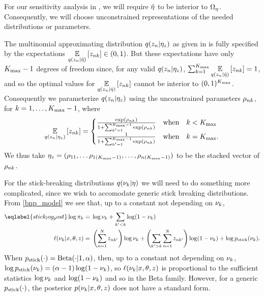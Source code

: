 
For our sensitivity analysis in , we will require
$\hat\eta$ to be interior to $\Omega_{\eta}$.  Consequently, we will choose
unconstrained representations of the needed distributions or parameters.


\begin{ex}
%
The multinomial approximating distribution $q(z_n \vert \eta_{z})$ as given in
 is fully specified by the expectations $\underset{q(z_n \vert
\hat\eta)}{\mathbb{E}}\left[z_{nk}\right] \in (0, 1)$.  But these expectations have only ${K_{\mathrm{max}}} -1$
degrees of freedom since, for any valid $q(z_n \vert \eta_{z})$,
$\sum_{k=1}^{K_{\mathrm{max}}} \underset{q(z_n \vert \hat\eta)}{\mathbb{E}}\left[z_{nk}\right] = 1$, and so the
optimal values for $\underset{q(z_n \vert \hat\eta)}{\mathbb{E}}\left[z_{nk}\right]$ cannot be
interior to $(0,1)^{K_{\mathrm{max}}}$.  Consequently we parameterize
$q(z_n \vert \eta_{z})$ using the unconstrained parameters $\rho_{nk}$,
for $k=1,\ldots,{K_{\mathrm{max}}} - 1$, where
%
\begin{align*}
%
\expect{\q(\z_\n \vert \etaz)}{\z_{\n\k}} =
\begin{cases}
    \frac{\exp(\rho_{\n\k})}{1 + \sum_{\k'=1}^{\kmax - 1}\exp(\rho_{\n\k})}
    & \mathrm{ when }\quad\k < \kmax \\
    \frac{1}{1 + \sum_{\k'=1}^{\kmax - 1}\exp(\rho_{\n\k})}
    & \mathrm{ when }\quad\k = \kmax.
\end{cases}
%
\end{align*}
%
We thus take $\eta_{z} = (\rho_{11}, \ldots \rho_{1({K_{\mathrm{max}}} - 1)}, \ldots,
\rho_{n({K_{\mathrm{max}}} - 1)})$ to be the stacked vector of $\rho_{nk}$.
%
\end{ex}



For the stick-breaking distributions $q(\nu_k \vert \eta)$ we will need to do
something more complicated, since we wish to accomodate generic stick breaking
distributions.  From \eqref{bnp_model} we see that, up to a constant not
depending on $\nu_k$,
%
\begin{align}\eqlabel{stick_log_post}
%
\log \pi_\k ={}&
    \log \nu_\k + \sum_{\k' < \k} \log (1 - \nu_\k) \nonumber \\
\logp(\nu_{\k} \vert \x, \theta, \z) ={}&
    \left(\sum_{\n=1}^\N \z_{\n\k'}\right) \log \nu_\k +
    \left( \sum_{\k' > \k} \sum_{\n=1}^\N \z_{\n\k'} \right) \log (1 - \nu_\k) +
    \log \pstick(\nu_\k).
%
\end{align}
%
When $p_{\mathrm{stick}}(\cdot) = \mathrm{Beta}(\cdot | 1, \alpha)$, then, up to a constant
not depending on $\nu_k$, $\log p_{\mathrm{stick}}(\nu_k) = (\alpha - 1) \log (1 -
\nu_k)$, so $\ell(\nu_{k} \vert x, \theta, z)$ is proportional to the
sufficient statistics $\log \nu_k$ and $\log(1 - \nu_k)$ and so in the
Beta family.  However, for a generic $p_{\mathrm{stick}}(\cdot)$, the posterior
$p(\nu_{k} \vert x, \theta, z)$ does not have a standard form.

